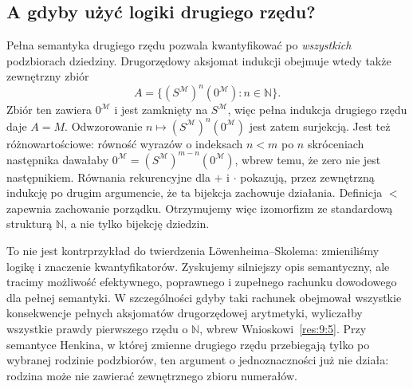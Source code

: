 \subsection*{A gdyby użyć logiki drugiego rzędu?}\label{sec:15:4}
Pełna semantyka drugiego rzędu pozwala kwantyfikować po \emph{wszystkich} podzbiorach dziedziny. Drugorzędowy aksjomat indukcji obejmuje wtedy także zewnętrzny zbiór
\[
A=\{(S^{\mathcal M})^n(0^{\mathcal M}):n\in\mathbb N\}.
\]
Zbiór ten zawiera $0^{\mathcal M}$ i jest zamknięty na $S^{\mathcal M}$, więc pełna indukcja drugiego rzędu daje $A=M$. Odwzorowanie $n\mapsto(S^{\mathcal M})^n(0^{\mathcal M})$ jest zatem surjekcją. Jest też różnowartościowe: równość wyrazów o indeksach $n<m$ po $n$ skróceniach następnika dawałaby $0^{\mathcal M}=(S^{\mathcal M})^{m-n}(0^{\mathcal M})$, wbrew temu, że zero nie jest następnikiem. Równania rekurencyjne dla $+$ i $\cdot$ pokazują, przez zewnętrzną indukcję po drugim argumencie, że ta bijekcja zachowuje działania. Definicja $<$ zapewnia zachowanie porządku. Otrzymujemy więc izomorfizm ze standardową strukturą $\mathbb N$, a nie tylko bijekcję dziedzin.

To nie jest kontrprzykład do twierdzenia Löwenheima--Skolema: zmieniliśmy logikę i znaczenie kwantyfikatorów. Zyskujemy silniejszy opis semantyczny, ale tracimy możliwość efektywnego, poprawnego i zupełnego rachunku dowodowego dla pełnej semantyki. W szczególności gdyby taki rachunek obejmował wszystkie konsekwencje pełnych aksjomatów drugorzędowej arytmetyki, wyliczałby wszystkie prawdy pierwszego rzędu o $\mathbb N$, wbrew Wnioskowi~\ref{res:9:5}. Przy semantyce Henkina, w której zmienne drugiego rzędu przebiegają tylko po wybranej rodzinie podzbiorów, ten argument o jednoznaczności już nie działa: rodzina może nie zawierać zewnętrznego zbioru numerałów.

